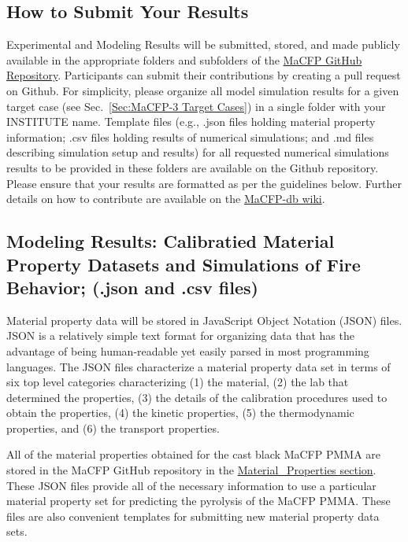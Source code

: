 \documentclass[12pt]{article}
\begin{document}
\subsection{How to Submit Your Results}
Experimental and Modeling Results will be submitted, stored, and made publicly available in the appropriate folders and subfolders of the \href{https://github.com/MaCFP/}{MaCFP GitHub Repository}. Participants can submit their contributions by creating a pull request on Github. For simplicity, please organize all model simulation results for a given target case (see Sec.~\ref{Sec:MaCFP-3 Target Cases}) in a single folder with your INSTITUTE name.  Template files (e.g., .json files holding material property information; .csv files holding results of numerical simulations; and .md files describing simulation setup and results) for all requested numerical simulations results to be provided in these folders are available on the Github repository. Please ensure that your results are formatted as per the guidelines below. Further details on how to contribute are available on the \href{https://github.com/MaCFP/macfp-db/wiki/How-to-Contribute}{MaCFP-db wiki}. 

\subsection{Modeling Results: Calibratied Material Property Datasets and Simulations of Fire Behavior; (.json and .csv files)}

Material property data will be stored in JavaScript Object Notation (JSON) files. JSON is a relatively simple text format for organizing data that has the advantage of being human-readable yet easily parsed in most programming languages. The JSON files characterize a material property data set in terms of six top level categories characterizing (1) the material, (2) the lab that determined the properties, (3) the details of the calibration procedures used to obtain the properties, (4) the kinetic properties, (5) the thermodynamic properties, and (6) the transport properties.

All of the material properties obtained for the cast black MaCFP PMMA are stored in the MaCFP GitHub repository in the \href{https://github.com/MaCFP/matl-db/tree/master/PMMA/Material_Properties}{Material\_Properties section}. These JSON files provide all of the necessary information to use a particular material property set for predicting the pyrolysis of the MaCFP PMMA. These files are also convenient templates for submitting new material property data sets.
\end{document}
